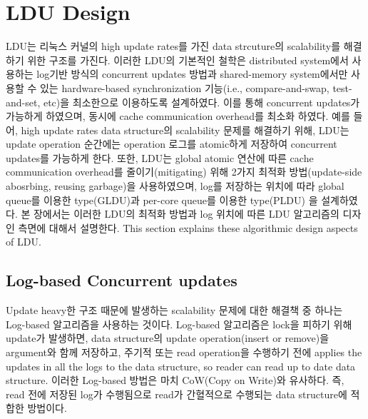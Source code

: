 \section{LDU Design}


\ifkor
LDU는 리눅스 커널의 high update rates를 가진 data strcuture의 scalability를 해결하기 위한 구조를
가진다.
이러한 LDU의 기본적인 철학은 distributed system에서 사용하는 log기반 방식의 concurrent updates 방법과
shared-memory system에서만 사용할 수 있는 hardware-based synchronization 기능(i.e.,
compare-and-swap, test-and-set, etc)을 최소한으로 이용하도록 설계하였다.
이를 통해 concurrent updates가 가능하게 하였으며, 동시에 cache communication overhead를 최소화 하였다. 
예를 들어, high update rates data structure의 scalability 문제를 해결하기 위해, LDU는 update
operation 순간에는 operation 로그를 atomic하게 저장하여 concurrent updates를 가능하게 한다. 
또한,  LDU는 global atomic 연산에 따른 cache communication overhead를 줄이기(mitigating)
위해 2가지 최적화 방법(update-side abosrbing, reusing garbage)을 사용하였으며,
log를 저장하는 위치에 따라 global queue를 이용한 type(GLDU)과 per-core queue를 이용한 type(PLDU)
을 설계하였다. 
본 장에서는 이러한 LDU의 최적화 방법과 log 위치에 따른 LDU 알고리즘의 디자인 측면에 대해서 설명한다. 
\else
This section explains these algorithmic design aspects of LDU.
\fi



\subsection{Log-based Concurrent updates}


\ifkor
Update heavy한 구조 때문에 발생하는 scalability 문제에 대한 해결책 중 하나는 Log-based 알고리즘을 사용하는 것이다.
Log-based 알고리즘은 lock을 피하기 위해 update가 발생하면, data structure의 update
operation(insert or remove)을 argument와 함께 저장하고, 주기적 또는 read operation을 수행하기 전에
applies the updates in all the logs to the data structure, so reader can read up to date data structure.
이러한 Log-based 방법은 마치 CoW(Copy on Write)와 유사하다.
즉, read 전에 저장된 log가 수행됨으로 read가 간혈적으로 수행되는 data structure에 적합한 방법이다.
\else

